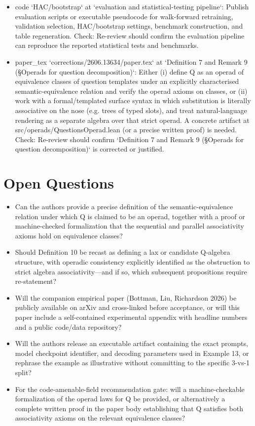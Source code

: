 \documentclass[11pt]{article}
\begin{document}
\begin{itemize}[leftmargin=*]
  \item [open] code `HAC/bootstrap` at `evaluation and statistical-testing pipeline`: Publish evaluation scripts or executable pseudocode for walk-forward retraining, validation selection, HAC/bootstrap settings, benchmark construction, and table regeneration. Check: Re-review should confirm the evaluation pipeline can reproduce the reported statistical tests and benchmarks.
  \item [open] paper\_tex `corrections/2606.13634/paper.tex` at `Definition 7 and Remark 9 (§Operads for question decomposition)`: Either (i) define Q as an operad of equivalence classes of question templates under an explicitly characterised semantic-equivalence relation and verify the operad axioms on classes, or (ii) work with a formal/templated surface syntax in which substitution is literally associative on the nose (e.g. trees of typed slots), and treat natural-language rendering as a separate algebra over that strict operad. A concrete artifact at src/operads/QuestionsOperad.lean (or a precise written proof) is needed. Check: Re-review should confirm `Definition 7 and Remark 9 (§Operads for question decomposition)` is corrected or justified.
\end{itemize}

\section*{Open Questions}
\begin{itemize}[leftmargin=*]
  \item Can the authors provide a precise definition of the semantic-equivalence relation under which Q is claimed to be an operad, together with a proof or machine-checked formalization that the sequential and parallel associativity axioms hold on equivalence classes?
  \item Should Definition 10 be recast as defining a lax or candidate Q-algebra structure, with operadic consistency explicitly identified as the obstruction to strict algebra associativity---and if so, which subsequent propositions require re-statement?
  \item Will the companion empirical paper (Bottman, Liu, Richardson 2026) be publicly available on arXiv and cross-linked before acceptance, or will this paper include a self-contained experimental appendix with headline numbers and a public code/data repository?
  \item Will the authors release an executable artifact containing the exact prompts, model checkpoint identifier, and decoding parameters used in Example 13, or rephrase the example as illustrative without committing to the specific 3-vs-1 split?
  \item For the code-amenable-field recommendation gate: will a machine-checkable formalization of the operad laws for Q be provided, or alternatively a complete written proof in the paper body establishing that Q satisfies both associativity axioms on the relevant equivalence classes?
\end{itemize}
\end{document}
